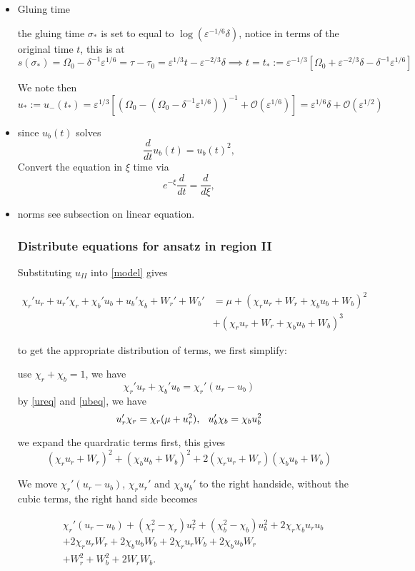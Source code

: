 \documentclass[letterpaper,11pt]{article}
\newcommand{\rmO}{\mathcal{O}}
\newcommand{\eps}{\varepsilon}
\numberwithin{equation}{section}
\theoremstyle{plain}
\begin{document}
\begin{itemize}
\item Gluing time


the gluing time $\sigma_*$ is set to equal to $ \log(\eps^{-1/6}\delta )$, notice in terms of the original time $t$, this is at
\[
s(\sigma_*) = \Omega_0-\delta^{-1}\eps^{1/6} = \tau -\tau_0 = \eps^{1/3}t - \eps^{-2/3}\delta \implies   t=t_*:= \eps^{-1/3}[\Omega_0+\eps^{-2/3}\delta -\delta^{-1} \eps^{1/6}]
\]

We note then 
\[
u_*:= u_-(t_*) = \eps^{1/3}[(\Omega_0-(\Omega_0-\delta^{-1}\eps^{1/6}))^{-1} + \rmO(\eps^{1/6})]  = \eps^{1/6}\delta+\rmO(\eps^{1/2})
\]

\item since $u_b(t)$ solves 
\[
\frac{d}{dt} u_b(t) = u_b(t)^2,
\]
Convert the equation in $\xi$ time via 
\[
e^{-\xi}\frac{d}{dt}  = \frac{d}{d\xi},
\]
\item norms
see subsection on linear equation.

\subsubsection{Distribute equations for ansatz in region II}

Substituting $u_{II}$ into \eqref{model} gives

\begin{align*}
\chi_r'u_r+ u_r'\chi_r +\chi_b'u_b+ u_b'\chi_b + W_r'+W_b' &=\mu+ (\chi_ru_r+W_r+\chi_bu_b+W_b)^2\\
&+  (\chi_ru_r+W_r+\chi_bu_b+W_b)^3
\end{align*}

to get the appropriate distribution of terms, we first simplify:

use $\chi_r+\chi_b = 1$, we have
\[
\chi_r'u_r+\chi_b'u_b = \chi_r'(u_r-u_b)
\]
by \eqref{ureq} and \eqref{ubeq}, we have
\[
u_r'\chi_r = \chi_r( \mu + u_r^2),\hspace{0.1in}
u_b'\chi_b = \chi_b u_b^2 
\]

we expand the quardratic terms first, this gives
\[
(\chi_ru_r+W_r)^2+(\chi_bu_b+W_b)^2+2(\chi_ru_r+W_r)(\chi_bu_b+W_b)
\]

We move $\chi_r'(u_r-u_b)$, $\chi_ru_r'$ and $\chi_bu_b'$ to the right handside, without the cubic terms, the right hand side becomes

\begin{align*}
&\chi_r'(u_r - u_b) + (\chi_r^2-\chi_r)u_r^2 + (\chi_b^2-\chi_b)u_b^2 + 2\chi_r\chi_bu_ru_b \\
&+ 2\chi_ru_rW_r + 2\chi_bu_bW_b + 2\chi_ru_rW_b+ 2\chi_bu_bW_r \\
&+ W_r^2 + W_b^2+ 2W_rW_b.
\end{align*}


\end{itemize}
\end{document}
